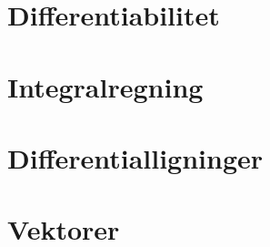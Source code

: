 








\chapter{Differentiabilitet}















\chapter{Integralregning}















\chapter{Differentialligninger}












\chapter{Vektorer}







